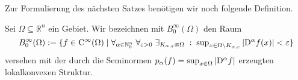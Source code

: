 

Zur Formulierung des nächsten Satzes benötigen wir noch folgende Definition.

\begin{df}
Sei $\Omega\subseteq\mathbb{R}^n$ ein Gebiet. Wir bezeichnen mit $B_0^\infty(\Omega)$ den Raum 
\begin{equation}
B_0^\infty(\Omega) :=\{f\in \mathrm C^\infty(\Omega) \mid \forall_{\alpha\in\mathbb N_0^n}\;\forall_{\varepsilon >0} \;\exists_{K_{\alpha,\varepsilon}\Subset\Omega} \;:\; \sup\nolimits_{x\in \Omega\setminus K_{\alpha,\varepsilon}}|\mathrm D^\alpha f(x)|<\varepsilon \}
\end{equation}
versehen mit der durch die Seminormen $p_\alpha(f)=\sup_{x\in\Omega} |\mathrm D^\alpha f|$ erzeugten lokalkonvexen Struktur.
\end{df}



